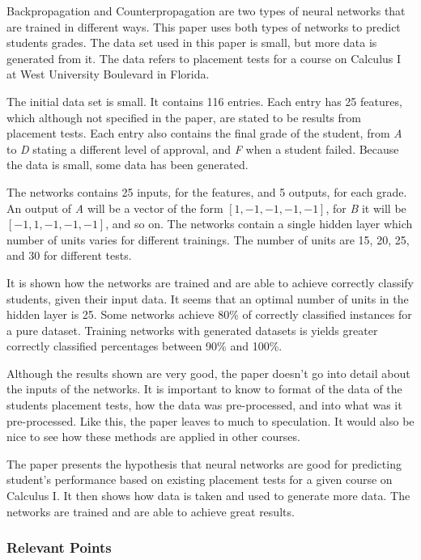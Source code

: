 Backpropagation and Counterpropagation are two types of neural networks that
are trained in different ways. This paper uses both types of networks to
predict students grades. The data set used in this paper is small, but more
data is generated from it. The data refers to placement tests for a course on
Calculus I at West University Boulevard in Florida.

The initial data set is small. It contains 116 entries. Each entry has 25
features, which although not specified in the paper, are stated to be results
from placement tests. Each entry also contains the final grade of the student,
from \textit{A} to \textit{D} stating a different level of approval, and
\textit{F} when a student failed. Because the data is small, some data has been
generated.

The networks contains 25 inputs, for the features, and 5 outputs, for each
grade. An output of \textit{A} will be a vector of the form $ [1, -1, -1, -1,
-1] $, for \textit{B} it will be $ [-1, 1, -1, -1, -1] $, and so on. The
networks contain a single hidden layer which number of units varies for
different trainings. The number of units are 15, 20, 25, and 30 for different
tests.

It is shown how the networks are trained and are able to achieve correctly
classify students, given their input data. It seems that an optimal number of
units in the hidden layer is 25. Some networks achieve 80\% of correctly
classified instances for a pure dataset. Training networks with generated
datasets is yields greater correctly classified percentages between 90\% and
100\%.

Although the results shown are very good, the paper doesn't go into detail
about the inputs of the networks. It is important to know to format of the data
of the students placement tests, how the data was pre-processed, and into what
was it pre-processed. Like this, the paper leaves to much to speculation. It
would also be nice to see how these methods are applied in other courses.

The paper presents the hypothesis that neural networks are good for predicting
student's performance based on existing placement tests for a given course on
Calculus I. It then shows how data is taken and used to generate more data. The
networks are trained and are able to achieve great results.

\subsubsection{Relevant Points}

